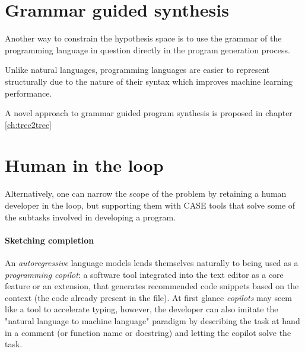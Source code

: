 \newpage
\section{Grammar guided synthesis}
\label{sec:grammar-guided}

Another way to constrain the hypothesis space is to use the grammar of the programming language in question directly in the program generation process.

Unlike natural languages, programming languages are easier to represent structurally due to the nature of their syntax which improves machine learning performance.

A novel approach to grammar guided program synthesis is proposed in chapter \ref{ch:tree2tree}

\newpage
\section{Human in the loop}
\label{sec:human}

Alternatively, one can narrow the scope of the problem by retaining a human developer in the loop, but supporting them with CASE \cite{caseComputeraidedSoftwareEngineering1985} tools that solve some of the subtasks involved in developing a program.

\paragraph{Sketching completion}


An \emph{autoregressive} language models lends themselves naturally to being used as a \emph{programming copilot}: a software tool integrated into the text editor as a core feature or an extension, that generates recommended code snippets based on the context (the code already present in the file).
At first glance \emph{copilots} may seem like a tool to accelerate typing, however, the developer can also imitate the "natural language to machine language" paradigm by describing the task at hand in a comment (or function name or docstring) and letting the copilot solve the task.


